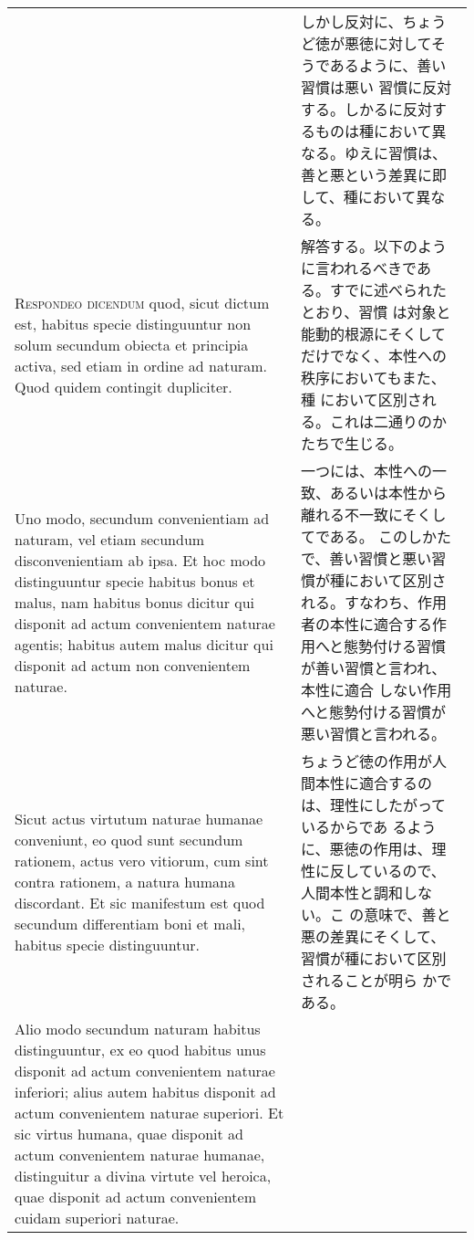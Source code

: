 \documentclass[10pt]{jsarticle}
\begin{document}
\begin{longtable}{p{21em}p{21em}}
&

しかし反対に、ちょうど徳が悪徳に対してそうであるように、善い習慣は悪い
習慣に反対する。しかるに反対するものは種において異なる。ゆえに習慣は、
善と悪という差異に即して、種において異なる。

\\

{\scshape Respondeo dicendum} quod, sicut dictum est, habitus specie
distinguuntur non solum secundum obiecta et principia activa, sed
etiam in ordine ad naturam. Quod quidem contingit dupliciter.

&

解答する。以下のように言われるべきである。すでに述べられたとおり、習慣
は対象と能動的根源にそくしてだけでなく、本性への秩序においてもまた、種
において区別される。これは二通りのかたちで生じる。

\\

Uno modo, secundum convenientiam ad naturam, vel etiam secundum
disconvenientiam ab ipsa. Et hoc modo distinguuntur specie habitus
bonus et malus, nam habitus bonus dicitur qui disponit ad actum
convenientem naturae agentis; habitus autem malus dicitur qui disponit
ad actum non convenientem naturae.

&

一つには、本性への一致、あるいは本性から離れる不一致にそくしてである。
このしかたで、善い習慣と悪い習慣が種において区別される。すなわち、作用
者の本性に適合する作用へと態勢付ける習慣が善い習慣と言われ、本性に適合
しない作用へと態勢付ける習慣が悪い習慣と言われる。

\\

Sicut actus virtutum naturae humanae conveniunt, eo quod sunt secundum
rationem, actus vero vitiorum, cum sint contra rationem, a natura
humana discordant. Et sic manifestum est quod secundum differentiam
boni et mali, habitus specie distinguuntur.

&

ちょうど徳の作用が人間本性に適合するのは、理性にしたがっているからであ
るように、悪徳の作用は、理性に反しているので、人間本性と調和しない。こ
の意味で、善と悪の差異にそくして、習慣が種において区別されることが明ら
かである。

\\

Alio modo secundum naturam habitus distinguuntur, ex eo quod habitus
unus disponit ad actum convenientem naturae inferiori; alius autem
habitus disponit ad actum convenientem naturae superiori. Et sic
virtus humana, quae disponit ad actum convenientem naturae humanae,
distinguitur a divina virtute vel heroica, quae disponit ad actum
convenientem cuidam superiori naturae.


\end{longtable}
\end{document}
